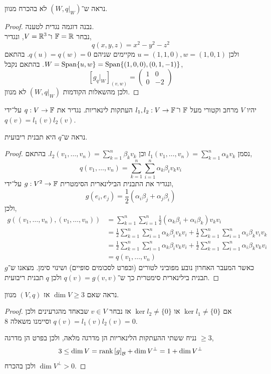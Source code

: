 \subquestion{}
נראה ש־$(W, q|_W)$ לא בהכרח מנוון.
\begin{proof}
	נבנה דוגמה נגדית לטענה. \\
	נבחר $\mathbb{F} = \mathbb{R}$ ו־$V = \mathbb{R}^3$, ונגדיר,
	\[
		q(x, y, z)
		= x^2 - y^2 - z^2
	\]
	ולכן $u = (1, 1, 0), w = (1, 0, 1)$ מקיימים שניהם $q(u) = q(w) = 0$.
	בהתאם $W = \operatorname{Span}\{ u, w \} = \operatorname{Span}\{ (1, 0, 0), (0, 1, -1) \}$.
	בהתאם נקבל,
	\[
		{[g_q|_W]}_{(v, w)}
		= \begin{pmatrix}
			1 & 0 \\
			0 & -2
		\end{pmatrix}
	\]
	ולכן מהשאלות הקודמות $(W, q|_W)$ לא מנוון.
\end{proof}

\question{}
יהיו $V$ מרחב וקטורי מעל $\mathbb{F}$ ו־$l_1, l_2 : V \to \mathbb{F}$ העתקות לינאריות.
נגדיר את $q : V \to \mathbb{F}$ על־ידי $q(v) = l_1(v) l_2(v)$.

\subquestion{}
נראה ש־$q$ היא תבנית ריבועית.
\begin{proof}
	נסמן $l_1(v_1, \ldots, v_n) = \sum_{k = 1}^n \alpha_k v_k$ וכן $l_2(v_1, \ldots, v_n) = \sum_{k = 1}^n \beta_k v_k$.
	בהתאם,
	\[
		q(v_1, \ldots, v_n)
		= \sum_{k = 1}^n \sum_{i = 1}^n \alpha_k \beta_i v_k v_i
	\]
	ונגדיר את התבנית הבילינארית הסימטרית $g : V^2 \to \mathbb{F}$ על־ידי,
	\[
		g(e_i, e_j)
		= \frac{1}{2} (\alpha_i \beta_j + \alpha_j \beta_i)
	\]
	ולכן,
	\begin{align*}
		g((v_1, \ldots, v_n), (v_1, \ldots, v_n))
		& = \sum_{k = 1}^n \sum_{i = 1}^n \frac{1}{2} (\alpha_k \beta_i + \alpha_i \beta_k) v_k v_i \\
		& = \frac{1}{2} \sum_{k = 1}^n \sum_{i = 1}^n \alpha_k \beta_i v_k v_i + \frac{1}{2} \sum_{k = 1}^n \sum_{i = 1}^n \alpha_i \beta_k v_i v_k \\
		& = \frac{1}{2} \sum_{k = 1}^n \sum_{i = 1}^n \alpha_k \beta_i v_k v_i + \frac{1}{2} \sum_{k = 1}^n \sum_{i = 1}^n \alpha_i \beta_k v_k v_i \\
		& = q(v_1, \ldots, v_n)
	\end{align*}
	כאשר המעבר האחרון נובע מפוביני לטורים (ובפרט לסכומים סופיים) ושינוי סימן.
	מצאנו ש־$g$ תבנית בילינארית סימטרית כך ש־$q(v) = g(v, v)$ ולכן $q$ תבנית ריבועית.
\end{proof}

\subquestion{}
נראה שאם $\dim V \ge 3$ אז $(V, q)$ מנוון.
\begin{proof}
	אם $\ker l_1 \ne \{ 0 \}$ או $\ker l_2 \ne \{ 0 \}$ אז נבחר $v \in V$ שבאחד מהגרעינים ולכן $q(v) = l_1(v) l_2(v) = 0$ וסיימנו משאלה 8.

	נניח ששתי ההעתקות הלינאריות הן מדרגה מלאה, ולכן בפרט הן מדרגה $\ge 3$,
	\[
		3 \le 
		\dim V
		= \operatorname{rank} {[ g ]}_{\mathcal{B}} + \dim V^\perp
		= 1 + \dim V^\perp
	\]
	ולכן בהכרח $\dim V^\perp > 0$.
\end{proof}

